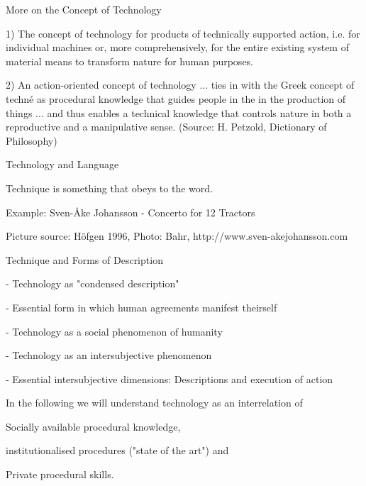 \documentclass{beamer}
\begin{document}
\begin{frame}{More on the Concept of Technology}

1) The concept of technology for products of technically supported action,
i.e. for individual machines or, more comprehensively, for the entire existing
system of material means to transform nature for human purposes.

2) An action-oriented concept of technology ... ties in with the Greek concept
of techné as procedural knowledge that guides people in the in the production
of things ... and thus enables a technical knowledge that controls nature in
both a reproductive and a manipulative sense. (Source: H. Petzold, Dictionary
of Philosophy)

\end{frame}

\begin{frame}{Technology and Language}

Technique is something that obeys to the word.

Example: Sven-Åke Johansson - Concerto for 12 Tractors

Picture source: Höfgen 1996, Photo: Bahr, http://www.sven-akejohansson.com

\end{frame}

\begin{frame}{Technique and Forms of Description}

- Technology as "condensed description"

- Essential form in which human agreements manifest theirself

- Technology as a social phenomenon of humanity

- Technology as an intersubjective phenomenon

- Essential intersubjective dimensions: Descriptions and execution of action

In the following we will understand technology as an interrelation of

Socially available procedural knowledge,

institutionalised procedures ("state of the art") and

Private procedural skills.

\end{frame}
\end{document}
